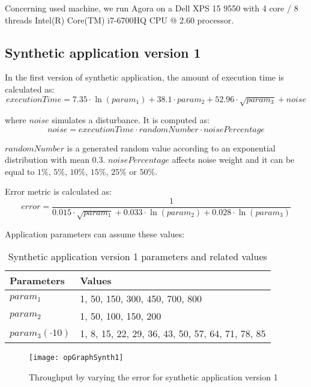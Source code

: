 Concerning used machine, we run Agora on a Dell XPS 15 9550 with 4 core / 8 threads Intel(R) Core(TM) i7-6700HQ CPU @ 2.60 processor.


\subsection{Synthetic application version 1}

In the first version of synthetic application, the amount of execution time is calculated as:
\[
executionTime = 7.35 \cdot \ln{(param_1)} + 38.1 \cdot param_2 + 52.96 \cdot \sqrt{param_3} + noise
\]

where $noise$ simulates a disturbance. It is computed as:
\[
noise = executionTime \cdot randomNumber \cdot noisePercentage
\]

$randomNumber$ is a generated random value according to an exponential distribution with mean 0.3. $noisePercentage$ affects noise weight and it can be equal to $1\%$, $5\%$, $10\%$, $15\%$, $25\%$ or $50\%$.

Error metric is calculated as:
\[
error = \dfrac{1}{0.015 \cdot \sqrt{param_1} + 0.033 \cdot \ln{(param_2)} + 0.028 \cdot \ln{(param_3)}}
\]

Application parameters can assume these values:

\begin{table}[H]

    \centering

    \begin{tabular}{ll}
    
        \toprule
        Parameters & Values \\
        \midrule
        $param_1$ & 1, 50, 150, 300, 450, 700, 800 \\
        $param_2$ & 1, 50, 100, 150, 200 \\
        $param_3 (\cdot 10)$ & 1, 8, 15, 22, 29, 36, 43, 50, 57, 64, 71, 78, 85 \\
        \bottomrule 
    
    \end{tabular}

    \caption{Synthetic application version 1 parameters and related values}

\end{table}

\begin{figure}[h]

    \centering
    \texttt{[image: opGraphSynth1]}

    \caption{Throughput by varying the error for synthetic application version 1}

    \label{fig::opListSynth1}
    
\end{figure}

